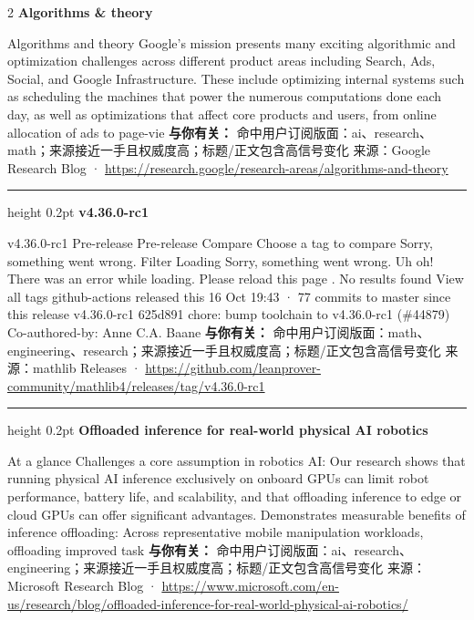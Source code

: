 \documentclass[10.5pt]{ctexart}
\begin{document}
\begin{multicols}{2}
{\large\bfseries Algorithms \& theory}\par
Algorithms and theory Google’s mission presents many exciting algorithmic and optimization challenges across different product areas including Search, Ads, Social, and Google Infrastructure. These include optimizing internal systems such as scheduling the machines that power the numerous computations done each day, as well as optimizations that affect core products and users, from online allocation of ads to page-vie
\textbf{与你有关：} 命中用户订阅版面：ai、research、math；来源接近一手且权威度高；标题/正文包含高信号变化
{\footnotesize\color{ormuted} 来源：Google Research Blog · \url{https://research.google/research-areas/algorithms-and-theory}}
\vspace{2mm}
\hrule height 0.2pt
\vspace{2mm}
{\large\bfseries v4.36.0-rc1}\par
v4.36.0-rc1 Pre-release Pre-release Compare Choose a tag to compare Sorry, something went wrong. Filter Loading Sorry, something went wrong. Uh oh! There was an error while loading. Please reload this page . No results found View all tags github-actions released this 16 Oct 19:43 · 77 commits to master since this release v4.36.0-rc1 625d891 chore: bump toolchain to v4.36.0-rc1 (\#44879) Co-authored-by: Anne C.A. Baane
\textbf{与你有关：} 命中用户订阅版面：math、engineering、research；来源接近一手且权威度高；标题/正文包含高信号变化
{\footnotesize\color{ormuted} 来源：mathlib Releases · \url{https://github.com/leanprover-community/mathlib4/releases/tag/v4.36.0-rc1}}
\vspace{2mm}
\hrule height 0.2pt
\vspace{2mm}
{\large\bfseries Offloaded inference for real-world physical AI robotics}\par
At a glance Challenges a core assumption in robotics AI: Our research shows that running physical AI inference exclusively on onboard GPUs can limit robot performance, battery life, and scalability, and that offloading inference to edge or cloud GPUs can offer significant advantages. Demonstrates measurable benefits of inference offloading: Across representative mobile manipulation workloads, offloading improved task
\textbf{与你有关：} 命中用户订阅版面：ai、research、engineering；来源接近一手且权威度高；标题/正文包含高信号变化
{\footnotesize\color{ormuted} 来源：Microsoft Research Blog · \url{https://www.microsoft.com/en-us/research/blog/offloaded-inference-for-real-world-physical-ai-robotics/}}

\end{multicols}
\end{document}
